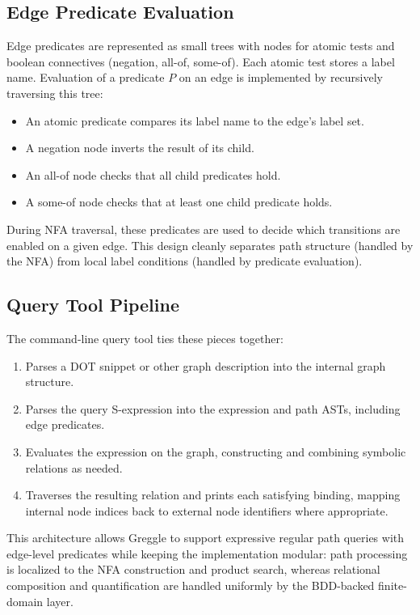 \documentclass[11pt]{article}
\begin{document}
\subsection*{Edge Predicate Evaluation}

Edge predicates are represented as small trees with nodes for atomic
tests and boolean connectives (negation, all-of, some-of).  Each
atomic test stores a label name.  Evaluation of a predicate $P$ on an
edge is implemented by recursively traversing this tree:
\begin{itemize}[leftmargin=*]
  \item An atomic predicate compares its label name to the edge's label
        set.
  \item A negation node inverts the result of its child.
  \item An all-of node checks that all child predicates hold.
  \item A some-of node checks that at least one child predicate holds.
\end{itemize}

During NFA traversal, these predicates are used to decide which
transitions are enabled on a given edge.  This design cleanly
separates path structure (handled by the NFA) from local label
conditions (handled by predicate evaluation).

\subsection*{Query Tool Pipeline}

The command-line query tool ties these pieces together:
\begin{enumerate}[leftmargin=*]
  \item Parses a DOT snippet or other graph description into the
        internal graph structure.
  \item Parses the query S-expression into the expression and path
        ASTs, including edge predicates.
  \item Evaluates the expression on the graph, constructing and
        combining symbolic relations as needed.
  \item Traverses the resulting relation and prints each satisfying
        binding, mapping internal node indices back to external node
        identifiers where appropriate.
\end{enumerate}

This architecture allows Greggle to support expressive regular path
queries with edge-level predicates while keeping the implementation
modular: path processing is localized to the NFA construction and
product search, whereas relational composition and quantification are
handled uniformly by the BDD-backed finite-domain layer.



\end{document}
